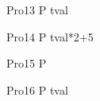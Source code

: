 \begin{circus}
    \circprocess Pro13 \circdef P \circendby \lcirctime tval \rcirctime \\
\end{circus}        

\begin{circus}
   \circprocess Pro14 \circdef P \circendby \lcirctime tval*2+5 \rcirctime \\
\end{circus}        

\begin{circus}
    \circprocess Pro15 \circdef P \circendby {}  \rcirctime \\
\end{circus}        

\begin{circus}
    \circprocess Pro16 \circdef P \circendby {} \upto tval \rcirctime  \\
\end{circus} 







